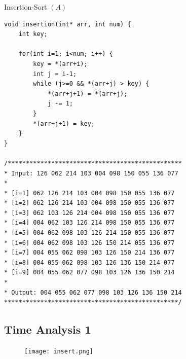 \documentclass[12pt,openany]{book}
\theoremstyle{definition}
\begin{document}
	\begin{algorithm}[H]
		\caption{Insertion-Sort $(A)$}
		\BlankLine
		\BlankLine
	\end{algorithm}
	\begin{lstlisting}[style=C]
void insertion(int* arr, int num) {
	int key;
	
	for(int i=1; i<num; i++) {
		key = *(arr+i);
		int j = i-1;
		while (j>=0 && *(arr+j) > key) {
			*(arr+j+1) = *(arr+j);
			j -= 1;
		}
		*(arr+j+1) = key;
	}
}

/************************************************
* Input: 126 062 214 103 004 098 150 055 136 077 
* 
* [i=1] 062 126 214 103 004 098 150 055 136 077 
* [i=2] 062 126 214 103 004 098 150 055 136 077 
* [i=3] 062 103 126 214 004 098 150 055 136 077 
* [i=4] 004 062 103 126 214 098 150 055 136 077 
* [i=5] 004 062 098 103 126 214 150 055 136 077 
* [i=6] 004 062 098 103 126 150 214 055 136 077 
* [i=7] 004 055 062 098 103 126 150 214 136 077 
* [i=8] 004 055 062 098 103 126 136 150 214 077 
* [i=9] 004 055 062 077 098 103 126 136 150 214 
* 
* Output: 004 055 062 077 098 103 126 136 150 214 
************************************************/
	\end{lstlisting}
	
	\subsection{Time Analysis 1}
	\begin{figure}[h!]
		\centering
		\texttt{[image: insert.png]}
	\end{figure}
	
\end{document}
